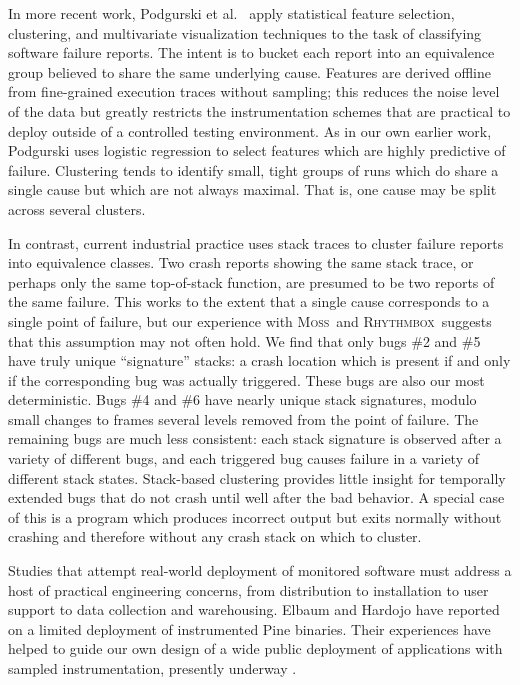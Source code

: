 \documentclass{sig-alternate}
\newcommand{\moss}{\textsc{Moss}\xspace}
\newcommand{\rhythmbox}{\textsc{Rhythmbox}\xspace}
\begin{document}
In more recent work, Podgurski et al.\ \cite{ICSE`03*465} apply
statistical feature selection, clustering, and multivariate
visualization techniques to the task of classifying software failure
reports.  The intent is to bucket each report into an equivalence
group believed to share the same underlying cause.  Features are
derived offline from fine-grained execution traces without sampling;
this reduces the noise level of the data but greatly restricts the
instrumentation schemes that are practical to deploy outside of a
controlled testing environment.  As in our own earlier work, Podgurski
uses logistic regression to select features which are highly
predictive of failure.  
Clustering tends to identify small, tight groups of runs which do
share a single cause but which are not always maximal.  That is, one
cause may be split across several clusters.

In contrast, current
industrial practice uses stack traces to cluster failure reports into
equivalence classes.  Two crash reports showing the same stack trace,
or perhaps only the same top-of-stack function, are presumed to be two
reports of the same failure.  This works to the extent that a single
cause corresponds to a single point of failure, but our experience
with \moss\ and \rhythmbox\ suggests that this assumption may not often hold.  We find
that only bugs \#2 and \#5 have truly unique ``signature'' stacks: a
crash location which is present if and only if the corresponding bug
was actually triggered.  These bugs are also our most deterministic.
Bugs \#4 and \#6 have nearly unique stack signatures, modulo small
changes to frames several levels removed from the point of failure.
The remaining bugs are much less consistent: each stack signature is
observed after a variety of different bugs, and each triggered bug
causes failure in a variety of different stack states.  Stack-based
clustering provides little insight for temporally extended bugs that
do not crash until well after the bad behavior.  A special case of
this is a program which produces incorrect output but exits normally
without crashing and therefore without any crash stack on which to
cluster.

Studies that attempt real-world deployment of monitored software must
address a host of practical engineering concerns, from distribution to
installation to user support to data collection and warehousing.
Elbaum and Hardojo \cite{Elbaum:2003:DISATA} have reported on a
limited deployment of instrumented Pine binaries.  Their experiences
have helped to guide our own design of a wide public deployment of
applications with sampled instrumentation, presently underway
\cite{Liblit:2003:CBIP}.
\end{document}
